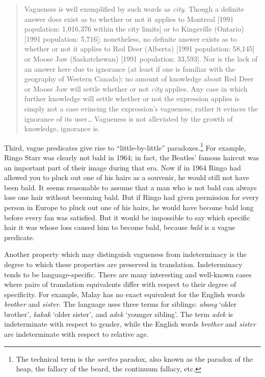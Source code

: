 \begin{quote}
Vagueness is well exemplified by such words as \textit{city}. Though a definite answer does exist as to whether or not it applies to Montreal [1991 population: 1,016,376 within the city limits] or to Kingsville (Ontario) [1991 population: 5,716]; nonetheless, no definite answer exists as to whether or not it applies to Red Deer (Alberta) [1991 population: 58,145] or Moose Jaw (Saskatchewan) [1991 population: 33,593]. Nor is the lack of an answer here due to ignorance (at least if one is familiar with the geography of Western Canada): no amount of knowledge about Red Deer or Moose Jaw will settle whether or not \textit{city} applies. Any case in which further knowledge will settle whether or not the expression applies is simply not a case evincing the expression’s vagueness; rather it evinces the ignorance of its user… Vagueness is not alleviated by the growth of knowledge, ignorance is.
\end{quote}


Third, vague predicates give rise to “little-by-little” paradoxes.\footnote{The technical term is the \textit{sorites} paradox, also known as the paradox of the heap, the fallacy of the beard, the continuum fallacy, etc.} For example, Ringo Starr was clearly not bald in 1964; in fact, the Beatles’ famous haircut was an important part of their image during that era. Now if in 1964 Ringo had allowed you to pluck out one of his hairs as a souvenir, he would still not have been bald. It seems reasonable to assume that a man who is not bald can always lose one hair without becoming bald. But if Ringo had given permission for every person in Europe to pluck out one of his hairs, he would have become bald long before every fan was satisfied. But it would be impossible to say which specific hair it was whose loss caused him to become bald, because \textit{bald} is a vague predicate.



Another property which may distinguish vagueness from indeterminacy is the degree to which these properties are preserved in translation. Indeterminacy tends to be language-specific. There are many interesting and well-known cases where pairs of translation equivalents differ with respect to their degree of specificity. For example, Malay has no exact equivalent for the English words \textit{brother} and \textit{sister}. The language uses three terms for siblings: \textit{abang} ‘older brother’, \textit{kakak} ‘older sister’, and \textit{adek} ‘younger sibling’. The term \textit{adek} is indeterminate with respect to gender, while the English words \textit{brother} and \textit{sister} are indeterminate with respect to relative age.



